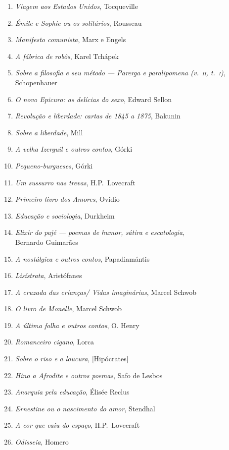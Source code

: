 \begin{enumerate}
\item \textit{Viagem aos Estados Unidos}, Tocqueville
\item \textit{Émile e Sophie ou os solitários}, Rousseau 
\item \textit{Manifesto comunista}, Marx e Engels
\item \textit{A fábrica de robôs}, Karel Tchápek 
\item \textit{Sobre a filosofia e seu método --- Parerga e paralipomena (v.~\textsc{ii}, t.~\textsc{i})},\\ Schopenhauer 
\item \textit{O novo Epicuro: as delícias do sexo}, Edward Sellon
\item \textit{Revolução e liberdade: cartas de 1845 a 1875}, Bakunin
\item \textit{Sobre a liberdade}, Mill
\item \textit{A velha Izerguil e outros contos}, Górki
\item \textit{Pequeno-burgueses}, Górki
\item \textit{Um sussurro nas trevas}, H.P.~Lovecraft
\item \textit{Primeiro livro dos Amores}, Ovídio
\item \textit{Educação e sociologia}, Durkheim
\item \textit{Elixir do pajé --- poemas de humor, sátira e escatologia},\\ Bernardo Guimarães
\item \textit{A nostálgica e outros contos}, Papadiamántis 
\item \textit{Lisístrata}, Aristófanes 
\item \textit{A cruzada das crianças/ Vidas imaginárias}, Marcel Schwob
\item \textit{O livro de Monelle}, Marcel Schwob
\item \textit{A última folha e outros contos}, O. Henry
\item \textit{Romanceiro cigano}, Lorca
\item \textit{Sobre o riso e a loucura}, [Hipócrates]
\item \textit{Hino a Afrodite e outros poemas}, Safo de Lesbos 
\item \textit{Anarquia pela educação}, Élisée Reclus 
\item \textit{Ernestine ou o nascimento do amor}, Stendhal
\item \textit{A cor que caiu do espaço}, H.P.~Lovecraft
\item \textit{Odisseia}, Homero

\end{enumerate}
